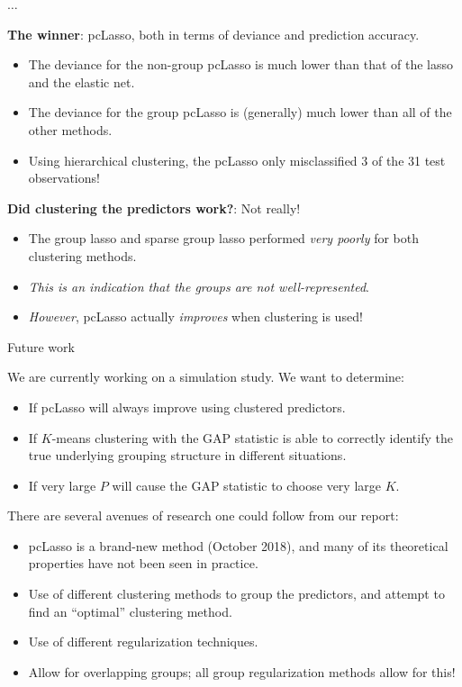 \documentclass[8pt]{beamer}
\newcommand{\mys}{\vspace{0.5cm} %
}
\begin{document}
\begin{frame}{$\ldots$}

\textbf{The winner}: pcLasso, both in terms of deviance and prediction accuracy.
\begin{itemize}
    \item The deviance for the non-group pcLasso is much lower than that of the lasso and the elastic net.
    \item The deviance for the group pcLasso is (generally) much lower than all of the other methods.
    \item Using hierarchical clustering, the pcLasso only misclassified 3 of the 31 test observations! %
\end{itemize} \mys

\textbf{Did clustering the predictors work?}: Not really!
\begin{itemize}
    \item The group lasso and sparse group lasso performed \textit{very poorly} for both clustering methods.
    \item \textit{This is an indication that the groups are not well-represented}.
    \item \textit{However}, pcLasso actually \textit{improves} when clustering is used!
\end{itemize}
    
\end{frame}

\begin{frame}{Future work}

We are currently working on a simulation study. We want to determine:
\begin{itemize}
    \item If pcLasso will always improve using clustered predictors.
    \item If $K$-means clustering with the GAP statistic is able to correctly identify the true underlying grouping structure in different situations.
    \item If very large $P$ will cause the GAP statistic to choose very large $K$.
\end{itemize} \mys

There are several avenues of research one could follow from our report:
\begin{itemize}
    \item pcLasso is a brand-new method (October 2018), and many of its theoretical properties have not been seen in practice.
    \item Use of different clustering methods to group the predictors, and attempt to find an ``optimal'' clustering method.
    \item Use of different regularization techniques.
    \item Allow for overlapping groups; all group regularization methods allow for this!
\end{itemize}
    
\end{frame}



%
%
    
\end{document}
